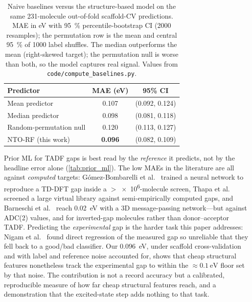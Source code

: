 \begin{table}[htbp]
  \centering
  \caption{Naive baselines versus the structure-based model on the same
    \num{231}-molecule out-of-fold scaffold-CV predictions. MAE in eV with
    \qty{95}{\percent} percentile-bootstrap CI (\num{2000} resamples); the
    permutation row is the mean and central \qty{95}{\percent} of \num{1000}
    label shuffles. The median outperforms the mean (right-skewed target); the
    permutation null is worse than both, so the model captures real signal.
    Values from \texttt{code/compute\_baselines.py}.}
  \label{tab:baselines}
  \begin{tabular}{lcc}
    \toprule
    Predictor & MAE (eV) & 95\% CI \\
    \midrule
    Mean predictor          & 0.107 & (0.092, 0.124) \\
    Median predictor        & 0.098 & (0.081, 0.118) \\
    Random-permutation null & 0.120 & (0.113, 0.127) \\
    \midrule
    NTO-RF (this work)      & \textbf{0.096} & (0.082, 0.109) \\
    \bottomrule
  \end{tabular}
\end{table}

Prior ML for TADF gaps is best read by the \emph{reference} it predicts, not by
the headline error alone (\cref{tab:prior_ml}). The low MAEs in the literature are
all against \emph{computed} targets: G\'omez-Bombarelli et
al.~\cite{Gomez-Bombarelli2016} trained a neural network to reproduce a TD-DFT gap
inside a $>$\num{e6}-molecule screen, Thapa et al.~\cite{Thapa2025} screened a
large virtual library against semi-empirically computed gaps, and Barneschi et al.~\cite{Barneschi2024}
reach \qty{0.02}{\electronvolt} with a 3D message-passing network---but against
ADC(2) values, and for inverted-gap molecules rather than donor--acceptor TADF.
Predicting the \emph{experimental} gap is the harder task this paper addresses:
Nigam et al.~\cite{Nigam2024} found direct regression of the measured gap so
unreliable that they fell back to a good/bad classifier. Our
\qty{0.096}{\electronvolt}, under scaffold cross-validation and with label and
reference noise accounted for, shows that cheap structural features nonetheless
track the experimental gap to within the $\approx\qty{0.1}{\electronvolt}$ floor
set by that noise. The contribution is not a record accuracy but a calibrated,
reproducible measure of how far cheap structural features reach, and a
demonstration that the excited-state step adds nothing to that task.

